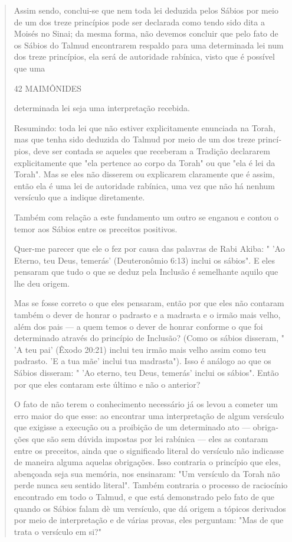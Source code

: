 \begin{quote}
Assim sendo, conclui-se que nem toda lei deduzida pelos Sábios por meio
de um dos treze princípios pode ser declarada como tendo sido dita a
Moisés no Sinai; da mesma forma, não devemos concluir que pelo fato de
os Sábios do Talmud encontrarem respaldo para uma determinada lei num
dos treze princípios, ela será de autoridade rabínica, visto que é
possível que uma

42 MAIMÔNIDES

determinada lei seja uma interpretação recebida.

Resumindo: toda lei que não estiver explicitamente enunciada na To­rah,
mas que tenha sido deduzida do Talmud por meio de um dos treze
princí­pios, deve ser contada se aqueles que receberam a Tradição
declararem expli­citamente que "ela pertence ao corpo da Torah" ou que
"ela é lei da Torah". Mas se eles não disserem ou explicarem claramente
que é assim, então ela é uma lei de autoridade rabínica, uma vez que não
há nenhum versículo que a indique diretamente.

Também com relação a este fundamento um outro se enganou e con­tou o
temor aos Sábios entre os preceitos positivos.

Quer-me parecer que ele o fez por causa das palavras de Rabi Akiba: "
'Ao Eterno, teu Deus, temerás' (Deuteronômio 6:13) inclui os sábios". E
eles pensaram que tudo o que se deduz pela Inclusão é semelhante aquilo
que lhe deu origem.

Mas se fosse correto o que eles pensaram, então por que eles não
contaram também o dever de honrar o padrasto e a madrasta e o irmão mais
velho, além dos pais --- a quem temos o dever de honrar conforme o que
foi determinado através do princípio de Inclusão? (Como os sábios
disseram, " 'A teu pai' (Êxodo 20:21) inclui teu irmão mais velho assim
como teu padrasto. 'E a tua mãe' inclui tua madrasta"). Isso é análogo
ao que os Sábios disseram: " 'Ao eterno, teu Deus, temerás' inclui os
sábios". Então por que eles conta­ram este último e não o anterior?

O fato de não terem o conhecimento necessário já os levou a come­ter um
erro maior do que esse: ao encontrar uma interpretação de algum
versí­culo que exigisse a execução ou a proibição de um determinado ato
--- obriga­ções que são sem dúvida impostas por lei rabínica --- eles as
contaram entre os preceitos, ainda que o significado literal do
versículo não indicasse de ma­neira alguma aquelas obrigações. Isso
contraria o princípio que eles, abençoa­da seja sua memória, nos
ensinaram: "Um versículo da Torah não perde nunca seu sentido literal".
Também contraria o processo de raciocínio encontrado em todo o Talmud, e
que está demonstrado pelo fato de que quando os Sábios falam dè um
versículo, que dá origem a tópicos derivados por meio de inter­pretação
e de várias provas, eles perguntam: "Mas de que trata o versículo em
si?"


\end{quote}

